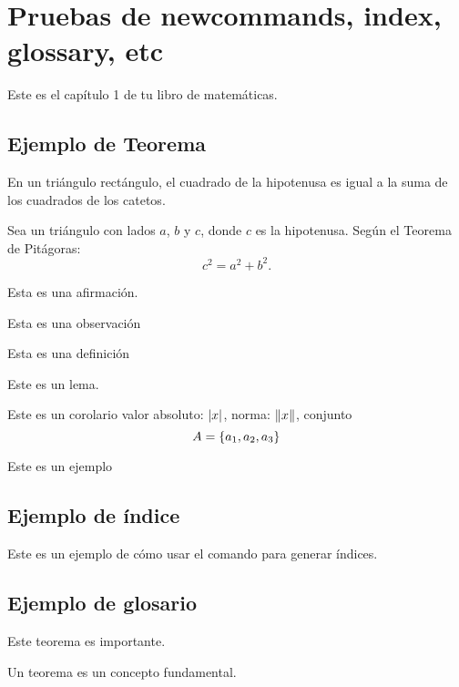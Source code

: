 \chapter{Pruebas de newcommands, index, glossary, etc}

Este es el capítulo 1 de tu libro de matemáticas.

\section{Ejemplo de Teorema}

\begin{theo}[Pitagoras]
En un triángulo rectángulo, el cuadrado de la hipotenusa es igual a la suma de los cuadrados de los catetos.
\end{theo}

\begin{dem}
Sea un triángulo con lados $a$, $b$ y $c$, donde $c$ es la hipotenusa. Según el Teorema de Pitágoras:
\[
c^2 = a^2 + b^2.
\]
\end{dem}

\begin{afir}
Esta es una afirmación.
\end{afir}

\begin{obs}
    Esta es una observación
\end{obs}

\begin{defi}
Esta es una definición
\end{defi}

\begin{lemma}
    Este es un lema.
\end{lemma}

\begin{corol}
    Este es un corolario valor absoluto: $\left\lvert x\right\rvert$, norma: $\left\lVert x\right\rVert$, 
    conjunto $$A=\left\{a_1,a_2,a_3\right\}$$
\end{corol}

\begin{ejem}
    Este es un ejemplo
\end{ejem}
\section{Ejemplo de índice}
Este es un ejemplo de cómo usar el comando  para generar índices.
\section{Ejemplo de glosario}
\begin{theo}
Este teorema es importante.
\end{theo}

Un \gls{teorema} es un concepto fundamental.